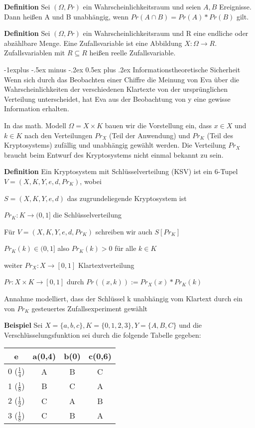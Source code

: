 \documentclass[a4paper]{article}
\makeatletter
\renewcommand{\subsection}{\@startsection{subsection}{2}{0mm}%
 {-1explus -.5ex minus -.2ex}%
 {0.5ex plus .2ex}%
 {\normalfont\normalsize\bfseries}}
\makeatother
\begin{document}
\begin{multicols}{3}
    \textbf{Definition} Sei $(\Omega,Pr)$ ein Wahrscheinlichkeitsraum und seien $A,B$ Ereignisse. Dann heißen A und B unabhängig, wenn $Pr(A\cap B)=Pr(A)*Pr(B)$ gilt.

    \textbf{Definition} Sei $(\Omega,Pr)$ ein Wahrscheinlichkeitsraum und R eine endliche oder abzählbare Menge. Eine Zufallsvariable ist eine Abbildung $X:\Omega\rightarrow R$. Zufallsvariablen mit $R\subseteq R$ heißen reelle Zufallsvariable.

    \subsection{Informationstheoretische Sicherheit}
    Wenn sich durch das Beobachten einer Chiffre die Meinung von Eva über die Wahrscheinlichkeiten der verschiedenen Klartexte von der ursprünglichen Verteilung unterscheidet, hat Eva aus der Beobachtung von y eine gewisse Information erhalten.

    In das math. Modell $\Omega=X\times K$ bauen wir die Vorstellung ein, dass $x\in X$ und $k\in K$ nach den Verteilungen $Pr_X$ (Teil der Anwendung) und $Pr_K$ (Teil des Kryptosystems) zufällig und unabhängig gewählt werden. Die Verteilung $Pr_X$ braucht beim Entwurf des Kryptosystems nicht einmal bekannt zu sein.

    \textbf{Definition} Ein Kryptosystem mit Schlüsselverteilung (KSV) ist ein 6-Tupel $V=(X,K,Y,e,d,Pr_K)$, wobei
    \begin{itemize*}
        \item $S=(X,K,Y,e,d)$ das zugrundeliegende Kryptosystem ist
        \item $Pr_K:K\rightarrow (0,1]$ die Schlüsselverteilung
        \item Für $V=(X,K,Y,e,d,Pr_K)$ schreiben wir auch $S[Pr_K]$
        \item $Pr_K(k)\in (0,1]$ also $Pr_K(k)> 0$ für alle $k\in K$
        \item weiter $Pr_X:X\rightarrow [0,1]$ Klartextverteilung
        \item $Pr:X\times K\rightarrow [0,1]$ durch $Pr((x,k)):=Pr_X(x)*Pr_K(k)$
        \item Annahme modelliert, dass der Schlüssel k unabhängig vom Klartext durch ein von $Pr_K$ gesteuertes Zufallsexperiment gewählt
    \end{itemize*}

    \textbf{Beispiel} Sei $X=\{a,b,c\},K=\{0,1,2,3\},Y=\{A,B,C\}$ und die Verschlüsselungsfunktion sei durch die folgende Tabelle gegeben:
    \begin{tabular}{c|c|c|c}
        e                 & a(0,4) & b(0) & c(0,6) \\\hline
        0 ($\frac{1}{4}$) & A      & B    & C      \\
        1 ($\frac{1}{8}$) & B      & C    & A      \\
        2 ($\frac{1}{2}$) & C      & A    & B      \\
        3 ($\frac{1}{8}$) & C      & B    & A
    \end{tabular}


\end{multicols}
\end{document}
